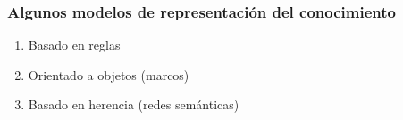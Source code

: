 \documentclass[
10pt, %
aspectratio=169, %
]{beamer}
\begin{document}
\begin{frame}
\begin{itemize}
		\end{itemize}
		
		
		
	\end{frame}
	
	\begin{frame}
		
		\frametitle{Algunos modelos de representación del conocimiento}
		
		\begin{enumerate}
			\item Basado en reglas
			\item Orientado a objetos (marcos)
			\item Basado en herencia (redes semánticas)
		\end{enumerate}
		
		
	\end{frame}
	
\end{document}
